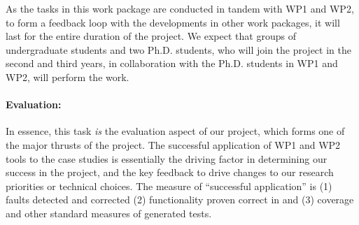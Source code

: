 As the tasks in this work package are conducted in tandem with WP1 and WP2, to form a feedback loop with the developments in other work packages, it will last for the entire duration of the project.
We expect that groups of undergraduate students and two
Ph.D. students, who will join the project in the second and third
years, in collaboration with the Ph.D. students in WP1 and WP2, will
perform the work.

\paragraph{Evaluation:} In essence, this task \emph{is} the evaluation
aspect of our project, which forms one of the major thrusts of
the project.  The successful application of WP1 and WP2 tools to the case studies is
essentially the driving factor in determining our success in the
project, and the key feedback to drive changes to our research
priorities or technical choices.  The measure of ``successful
application'' is (1) faults detected and corrected (2) functionality
proven correct in \framac and (3) coverage and other standard measures
of generated tests.

\label{sec:time-line}

